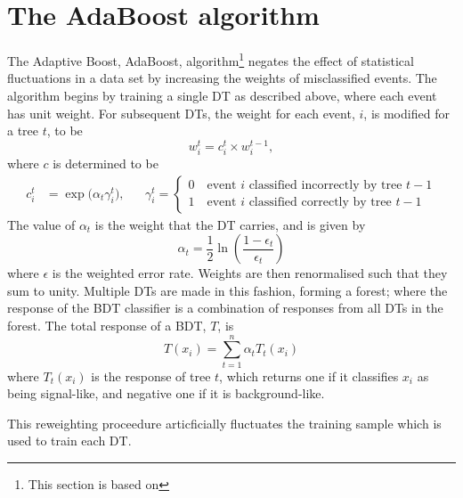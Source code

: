 \section{The AdaBoost algorithm}
\label{sec:bdt:ada}
The Adaptive Boost, AdaBoost, algorithm\footnote{
  This section is based on } negates the effect of statistical
fluctuations in a data set by increasing the weights of misclassified events.
The algorithm begins by training a single DT as described above, where each event has unit weight.
For subsequent DTs, the weight for each event, $i$, is modified for a tree $t$, to be
\begin{equation}
  w_i^t = c_i^t \times w_i^{t-1},
  \label{eq:ada:wt}
\end{equation}
where $c$ is determined to be
\begin{align}
  c_i^t &= \exp\big(\alpha_t\gamma_i^t\big),
  &&
  \gamma_i^t=\left\{
    \begin{array}{l}
      0\quad\text{event $i$ classified incorrectly by tree $t-1$} \\
      1\quad\text{event $i$ classified correctly by tree $t-1$}
    \end{array}
  \right.
\end{align}
The value of $\alpha_t$ is the weight that the DT carries, and is given by
\begin{equation}
  \alpha_t = \frac12\ln\left(\frac{1-\epsilon_t}{\epsilon_t}\right)
\end{equation}
where $\epsilon$ is the weighted error rate.
Weights are then renormalised such that they sum to unity.
Multiple DTs are made in this fashion, forming a forest; where the response of the BDT classifier
is a combination of responses from all DTs in the forest.
The total response of a BDT, $T$, is
\begin{equation}
  T(x_i) = \sum_{t=1}^{n} \alpha_tT_t(x_i)
  \label{eq:ada:fullbdt}
\end{equation}
where $T_t(x_i)$ is the response of tree $t$, which returns one if it classifies $x_i$ as being
signal-like, and negative one if it is background-like.

This reweighting proceedure articficially fluctuates the training sample which is used to train
each DT.


